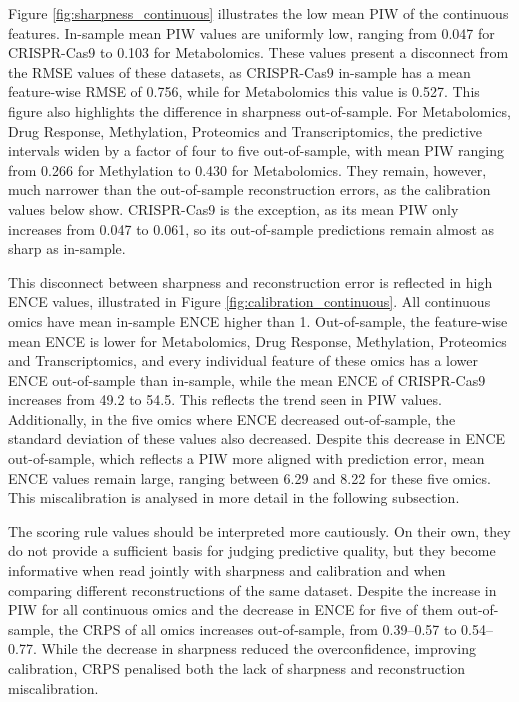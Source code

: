 
Figure \ref{fig:sharpness_continuous} illustrates the low mean PIW of the continuous features. In-sample mean PIW values are uniformly low, ranging from 0.047 for CRISPR-Cas9 to 0.103 for Metabolomics. These values present a disconnect from the RMSE values of these datasets, as CRISPR-Cas9 in-sample has a mean feature-wise RMSE of 0.756, while for Metabolomics this value is 0.527. This figure also highlights the difference in sharpness out-of-sample. For Metabolomics, Drug Response, Methylation, Proteomics and Transcriptomics, the predictive intervals widen by a factor of four to five out-of-sample, with mean PIW ranging from 0.266 for Methylation to 0.430 for Metabolomics. They remain, however, much narrower than the out-of-sample reconstruction errors, as the calibration values below show. CRISPR-Cas9 is the exception, as its mean PIW only increases from 0.047 to 0.061, so its out-of-sample predictions remain almost as sharp as in-sample.


This disconnect between sharpness and reconstruction error is reflected in high ENCE values, illustrated in Figure \ref{fig:calibration_continuous}. All continuous omics have mean in-sample ENCE higher than 1. Out-of-sample, the feature-wise mean ENCE is lower for Metabolomics, Drug Response, Methylation, Proteomics and Transcriptomics, and every individual feature of these omics has a lower ENCE out-of-sample than in-sample, while the mean ENCE of CRISPR-Cas9 increases from 49.2 to 54.5. This reflects the trend seen in PIW values. Additionally, in the five omics where ENCE decreased out-of-sample, the standard deviation of these values also decreased. Despite this decrease in ENCE out-of-sample, which reflects a PIW more aligned with prediction error, mean ENCE values remain large, ranging between 6.29 and 8.22 for these five omics. This miscalibration is analysed in more detail in the following subsection.


The scoring rule values should be interpreted more cautiously. On their own, they do not provide a sufficient basis for judging predictive quality, but they become informative when read jointly with sharpness and calibration and when comparing different reconstructions of the same dataset. Despite the increase in PIW for all continuous omics and the decrease in ENCE for five of them out-of-sample, the CRPS of all omics increases out-of-sample, from 0.39--0.57 to 0.54--0.77. While the decrease in sharpness reduced the overconfidence, improving calibration, CRPS penalised both the lack of sharpness and reconstruction miscalibration. 



